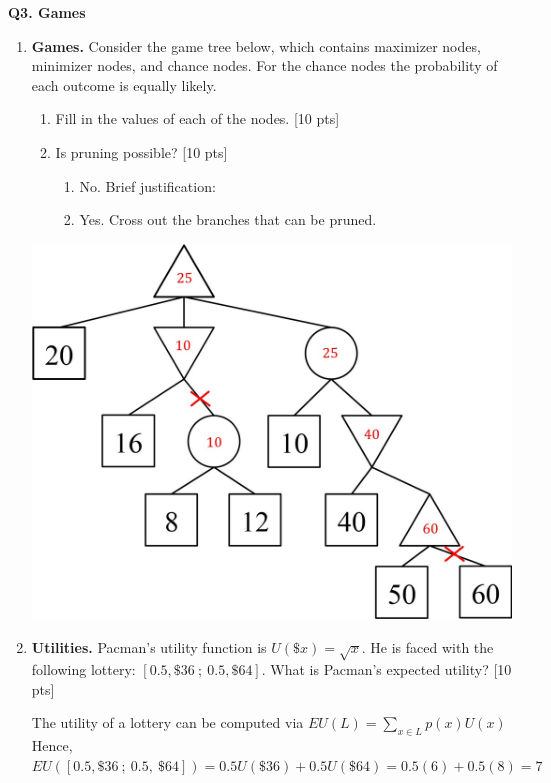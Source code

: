 \textbf{Q3. Games} \\

\begin{enumerate}
\item {\bf Games.} 
Consider the game tree below, which contains maximizer nodes, minimizer nodes, and chance nodes.  For the chance nodes the probability of each outcome is equally likely.

\begin{enumerate}
	\item  Fill in the values of each of the nodes. [10 pts] \\[3mm]

	\item Is pruning possible? [10 pts] \\[1mm]
	\begin{enumerate}
		\item No.  Brief justification: \\
		\item Yes.  Cross out the branches that can be pruned.
	\end{enumerate}
     

\end{enumerate}

\begin{center}
\includegraphics[width=0.71\linewidth]{figures/short-questions-games_sol.jpg}
\end{center}



\item {\bf Utilities.} Pacman's utility function is $U(\$ x) = \sqrt{x}$.  He is faced with the following lottery: $[0.5, \$ 36 \ ; \ 0.5, \$ 64]$. What is Pacman's expected utility? [10 pts]

{ \color{red}
The utility of a lottery can be computed via $EU(L) = \sum_{x \in L} p(x) U(x)$ \\
Hence, $EU( [0.5, \$ 36 \ ; \ 0.5, \ \$ 64]) = 0.5 U( \$36) + 0.5 U( \$64) = 0.5 (6) + 0.5 (8) = 7$
}


\end{enumerate}
